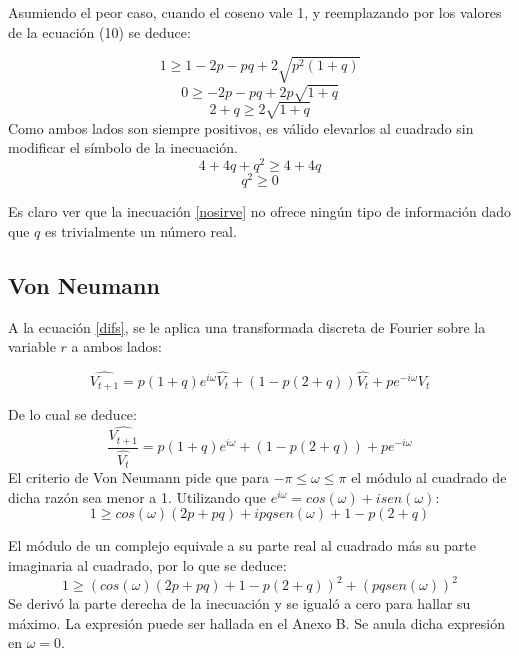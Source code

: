 ﻿\documentclass[%
final,
%
reprint,
%
notitlepage,
narroweqnarray,
inline,
twoside,
invited
]{ieee}
\begin{document}
Asumiendo el peor caso, cuando el coseno vale 1, y reemplazando por los valores de la ecuación (10) se deduce: 

\[
1 \geq 1-2p-pq + 2\sqrt{p^2(1+q)}
\]
\[
0 \geq -2p - pq + 2p\sqrt{1+q}
\]
\[
2 +q \geq 2\sqrt{1+q}
\]
Como ambos lados son siempre positivos, es válido elevarlos al cuadrado sin modificar el símbolo de la inecuación.
\[
4 + 4q + q^2 \geq 4+4q
\]
\begin{equation}\label{nosirve}
 q^2 \geq 0
\end{equation}

Es claro ver que la inecuación \eqref{nosirve} no ofrece ningún tipo de información dado que $q$ es trivialmente 
un número real.

\subsection{Von Neumann}

A la ecuación \eqref{difs}, se le aplica una transformada discreta de Fourier sobre la variable $r$ a ambos lados: 

\[
\widehat{V_{t+1}} = p(1+q)e^{i\omega}\widehat{V_t}+(1-p(2+q))\widehat{V_t}+pe^{-i\omega}\widehat{V_t}
\]

De lo cual se deduce:
\begin{equation}
\frac{\widehat{V_{t+1}}}{\widehat{V_t}} = p(1+q)e^{i\omega}+(1-p(2+q))+pe^{-i\omega}
\end{equation}
El criterio de Von Neumann pide que para $-\pi \leq \omega \leq \pi$ el módulo al cuadrado de dicha razón 
sea menor a 1. Utilizando que $e^{i\omega} = cos(\omega) + i sen(\omega)$:
\begin{equation}
1 \geq  cos(\omega) (2p+pq) + ipqsen(\omega)+ 1 - p(2+q)
\end{equation}

El módulo de 
un complejo equivale a su parte real al cuadrado más su parte imaginaria al cuadrado, por lo que se deduce:
\begin{equation}\label{vnvn}
1 \geq  (cos(\omega) (2p+pq) + 1 - p(2+q))^2 + (pqsen(\omega))^2
\end{equation}
Se derivó la parte derecha de la inecuación y se igualó a cero para hallar su máximo. La expresión 
puede ser hallada en el Anexo B. Se anula dicha expresión en $\omega =0$.
\end{document}
